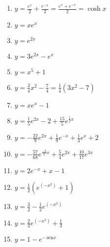 \documentclass[a4paper]{article}
\providecommand{\sin}{} \renewcommand{\sin}{\hspace{2pt}\mathrm{sen}}
\begin{document}
\begin{enumerate}
  \begin{enumerate}
  \item $y=\frac{e^x}{2}+ \frac{e^{-x}}{2} = \frac{e^x+ e^{-x}}{2} =
    \cosh x$ %
  \item $y=xe^{x}$ %
  \item $y=e^{2x}$ %
  \item $y=3e^{2x} - e^x$ %
  \item $y=x^5 +1$ %
  \item $y=\frac{3}{4}x^2 -\frac{7}{4} = \frac{1}{4}(3x^2 -7)$ %
  \item $y=xe^x-1$ %
  \item $y=\frac{1}{5}e^{2x} -2 +\frac{15}{5}e^{\frac{1}{2}x}$ %
  \item $y=-\frac{22}{9}e^{2x} + \frac{1}{9}e^{-x} + \frac{1}{3}e^{x} +2$ %
  \item $y=-\frac{57}{68}e^{\frac{-2}{5}x} + \frac{5}{4}e^{2x} + \frac{10}{17}e^{3x}$ %
  \item $y=2 e^{-x} + x -1$ %
  \item $y=\frac{1}{2}(e^{(-x^2)} + 1)$ %
  \item $y=\frac{3}{2}-\frac{1}{2}e^{(-x^2)} $ %
  \item $y= \frac{2}{3}e^{(-x^3)} + \frac{1}{3}$ %
  \item $y=1-e^{-\sin x}$ %
  \end{enumerate}

\end{enumerate}
\end{document}
